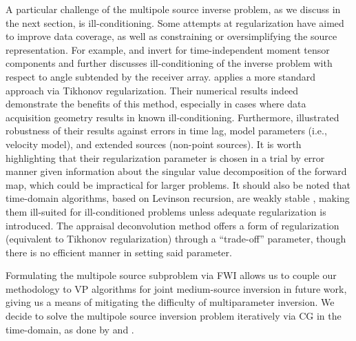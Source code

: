 A particular challenge of the multipole source inverse problem, as we discuss in the next section, is ill-conditioning.
Some attempts at regularization have aimed to improve data coverage, as well as constraining or oversimplifying the source representation.
For example, \cite{Eaton:10} and \cite{Song:11} invert for time-independent moment tensor components and \cite{Eaton:10} further discusses ill-conditioning of the inverse problem with respect to angle subtended by the receiver array.
\cite{Koch:91} applies a more standard approach via Tikhonov regularization.
Their numerical results indeed demonstrate the benefits of this method, especially in cases where data acquisition geometry results in known ill-conditioning. 
Furthermore, \cite{Koch:91} illustrated robustness of their results against errors in time lag, model parameters (i.e., velocity model), and extended sources (non-point sources). 
It is worth highlighting that their regularization parameter is chosen in a trial by error manner given information about the singular value decomposition of the forward map, which could be impractical for larger problems.
It should also be noted that time-domain algorithms, based on Levinson recursion, are weakly stable \citep{Bunch:85}, making them ill-suited for ill-conditioned problems unless adequate regularization is introduced.
The appraisal deconvolution method offers a form of regularization (equivalent to Tikhonov regularization) through a ``trade-off'' parameter, though there is no efficient manner in setting said parameter.

Formulating the multipole source subproblem via FWI allows us to couple our methodology to VP algorithms for joint medium-source inversion in future work, giving us a means of mitigating the difficulty of multiparameter inversion.
We decide to solve the multipole source inversion problem iteratively via CG in the time-domain, as done by \cite{SymMink:97} and \cite{Wang:09}.



